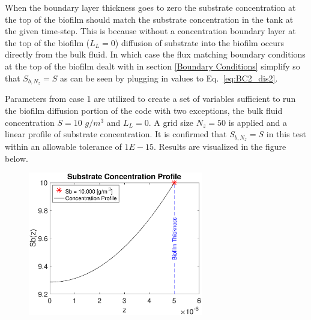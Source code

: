 \documentclass[letterpaper, twoside]{article}
\numberwithin{equation}{section}
\begin{document}
When the boundary layer thickness goes to zero the substrate concentration at the top of the biofilm should match the substrate concentration in the tank at the given time-step. This is because without a concentration boundary layer at the top of the biofilm ($L_L=0$) diffusion of substrate into the biofilm occurs directly from the bulk fluid. In which case the flux matching boundary conditions at the top of the biofilm dealt with in section \ref{Boundary Conditions} simplify so that $S_{b,N_z}=S$ as can be seen by plugging in values to Eq.~\ref{eq:BC2_dis2}.

Parameters from case 1 are utilized to create a set of variables sufficient to run the biofilm diffusion portion of the code with two exceptions, the bulk fluid concentration $S=10$ $g/m^3$ and $L_L=0$. A grid size $N_z=50$ is applied and a linear profile of substrate concentration. It is confirmed that $S_{b,N_z}=S$ in this test within an allowable tolerance of $1E-15$. Results are visualized in the figure below.

\begin{figure}[H]
  \centering
  \includegraphics[read=eps, width=3in]{BoundaryLayer_Figure1.eps}
\end{figure}
\end{document}
